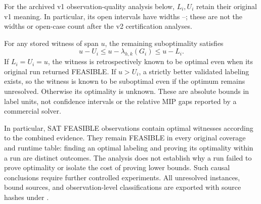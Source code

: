 \begin{table}[htbp]
\centering\small\setlength{\tabcolsep}{4pt}
\caption{Consolidated optimality evidence for 117 instances.}
\label{tab:gap-coverage}

\end{table}



For the archived v1 observation-quality analysis below, $L_i,U_i$ retain
their original v1 meaning. In particular, its \GapOpen{} open intervals
have widths \GapOpenMin{}--\GapOpenMax{}; these are not the widths or
open-case count after the v2 certification analyses.

For any stored witness of span $u$, the remaining suboptimality satisfies
\[
 u-U_i\leq u-\lambda_{h,k}(G_i)\leq u-L_i.
\]
If $L_i=U_i=u$, the witness is retrospectively known to be optimal even
when its original run returned FEASIBLE. If $u>U_i$, a strictly better
validated labeling exists, so the witness is known to be suboptimal even
if the optimum remains unresolved. Otherwise its optimality is unknown.
These are absolute bounds in label units, not confidence intervals or
the relative MIP gaps reported by a commercial solver.

\begin{table}[htbp]
\centering\small
\caption{Retrospective witness quality in archived v1.}
\label{tab:feasible-quality}

\end{table}

In particular, \GapSATFeasibleOptimal{} SAT FEASIBLE observations contain
optimal witnesses according to the combined evidence. They remain FEASIBLE
in every original coverage and runtime table: finding an optimal labeling
and proving its optimality within a run are distinct outcomes. The analysis
does not establish why a run failed to prove optimality or isolate the cost
of proving lower bounds. Such causal conclusions require further controlled
experiments. All unresolved instances, bound sources, and observation-level
classifications are exported with source hashes under
.

